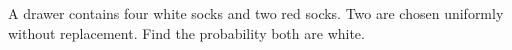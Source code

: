 A drawer contains four white socks and two red socks. Two are chosen uniformly without replacement. Find the probability both are white.
